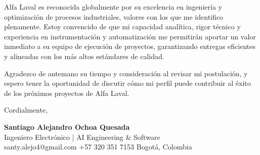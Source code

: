 \documentclass[11pt,a4paper]{article}
\begin{document}
Alfa Laval es reconocida globalmente por su excelencia en ingeniería y optimización de procesos industriales, valores con los que me identifico plenamente. Estoy convencido de que mi capacidad analítica, rigor técnico y experiencia en instrumentación y automatización me permitirán aportar un valor inmediato a su equipo de ejecución de proyectos, garantizando entregas eficientes y alineadas con los más altos estándares de calidad.

Agradezco de antemano su tiempo y consideración al revisar mi postulación, y espero tener la oportunidad de discutir cómo mi perfil puede contribuir al éxito de los próximos proyectos de Alfa Laval.

\vspace{10pt}
\noindent Cordialmente,

\vspace{12pt}
\noindent
\textbf{\large\color{accent} Santiago Alejandro Ochoa Quesada}\\
{\small\color{subtletext} Ingeniero Electrónico | AI Engineering \& Software}\\
{\footnotesize\color{subtletext} santy.alejo4@gmail.com \;\textbar\; +57 320 351 7153 \;\textbar\; Bogotá, Colombia}
\end{document}

